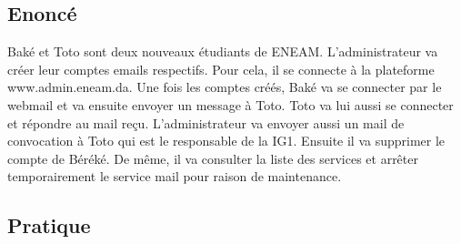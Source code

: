 \documentclass[a4paper,12pt,french]{report} %
\begin{document}
\subsection{Enoncé}
Baké et Toto sont deux nouveaux étudiants de ENEAM. L'administrateur va créer leur comptes emails respectifs. Pour cela, il se connecte à la plateforme www.admin.eneam.da. Une fois les comptes créés, Baké va se connecter par le webmail et va ensuite envoyer un message à Toto. Toto va lui aussi se connecter et répondre au mail reçu. L'administrateur va envoyer aussi un mail de convocation à Toto qui est le responsable de la IG1. Ensuite il va supprimer le compte de Béréké. De même, il va consulter la liste des services et arrêter temporairement le service mail pour raison de maintenance.

\subsection{Pratique}
\end{document}
